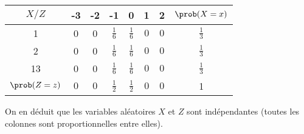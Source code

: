 {\begin{enumerate}
{\begin{center}
	\begin{tabular}{|c|c|c|c|c|c|c|c|}
		\hline
		$X/Z$ & -3 & -2 & -1 & 0 & 1 & 2 & $\prob(X = x)$ \\
		\hline
		1 & 0 & 0 & $\frac{1}{6}$ & $\frac{1}{6}$ & $0$ & $0$ & $\frac{1}{3}$ \\
		\hline
		2 & 0 & 0 & $\frac{1}{6}$ & $\frac{1}{6}$ & $0$ & $0$ & $\frac{1}{3}$ \\
		\hline
		13 & 0 & 0 & $\frac{1}{6}$ & $\frac{1}{6}$ & $0$ & $0$ & $\frac{1}{3}$ \\
		\hline
		$\prob(Z = z)$ & $0$ & $0$ & $\frac{1}{2}$ & $\frac{1}{2}$ & $0$ & $0$ & 1 \\
		\hline
	\end{tabular}
\end{center}
On en déduit que les variables aléatoires $X$ et $Z$ sont indépendantes (toutes les colonnes sont proportionnelles entre elles).
	}
\end{enumerate}
}